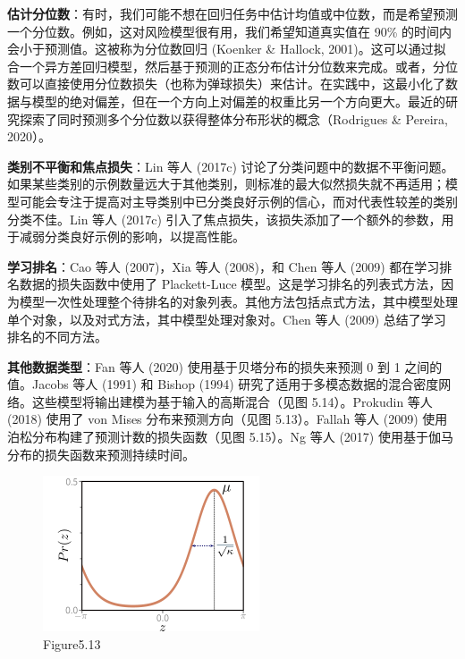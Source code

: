\textbf{估计分位数}：有时，我们可能不想在回归任务中估计均值或中位数，而是希望预测一个分位数。例如，这对风险模型很有用，我们希望知道真实值在 90\% 的时间内会小于预测值。这被称为分位数回归 (Koenker \& Hallock, 2001)。这可以通过拟合一个异方差回归模型，然后基于预测的正态分布估计分位数来完成。或者，分位数可以直接使用分位数损失（也称为弹球损失）来估计。在实践中，这最小化了数据与模型的绝对偏差，但在一个方向上对偏差的权重比另一个方向更大。最近的研究探索了同时预测多个分位数以获得整体分布形状的概念（Rodrigues \& Pereira, 2020）。

\textbf{类别不平衡和焦点损失}：Lin 等人 (2017c) 讨论了分类问题中的数据不平衡问题。如果某些类别的示例数量远大于其他类别，则标准的最大似然损失就不再适用；模型可能会专注于提高对主导类别中已分类良好示例的信心，而对代表性较差的类别分类不佳。Lin 等人 (2017c) 引入了焦点损失，该损失添加了一个额外的参数，用于减弱分类良好示例的影响，以提高性能。

\textbf{学习排名}：Cao 等人 (2007)，Xia 等人 (2008)，和 Chen 等人 (2009) 都在学习排名数据的损失函数中使用了 Plackett-Luce 模型。这是学习排名的列表式方法，因为模型一次性处理整个待排名的对象列表。其他方法包括点式方法，其中模型处理单个对象，以及对式方法，其中模型处理对象对。Chen 等人 (2009) 总结了学习排名的不同方法。

\textbf{其他数据类型}：Fan 等人 (2020) 使用基于贝塔分布的损失来预测 0 到 1 之间的值。Jacobs 等人 (1991) 和 Bishop (1994) 研究了适用于多模态数据的混合密度网络。这些模型将输出建模为基于输入的高斯混合（见图 5.14）。Prokudin 等人 (2018) 使用了 von Mises 分布来预测方向（见图 5.13）。Fallah 等人 (2009) 使用泊松分布构建了预测计数的损失函数（见图 5.15）。Ng 等人 (2017) 使用基于伽马分布的损失函数来预测持续时间。

\begin{figure}[ht!]
	\centering
	\includegraphics[width=0.7\linewidth]{png/chapter5/LossVonMises.png}
	\caption{Figure5.13}
\end{figure}

